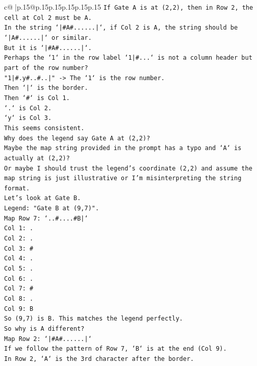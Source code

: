 \documentclass{article}
\begin{document}
{\begin{supertabular}{c@{$\;$}|p{.15\linewidth}@{}p{.15\linewidth}p{.15\linewidth}p{.15\linewidth}p{.15\linewidth}p{.15\linewidth}}
{{{\texttt{If Gate A is at (2,2), then in Row 2, the cell at Col 2 must be A.} \\
\texttt{In the string `|\#A\#......|`, if Col 2 is A, the string should be `|A\#......|` or similar.} \\
\texttt{But it is `|\#A\#......|`.} \\
\texttt{Perhaps the `1` in the row label `1|\#...` is not a column header but part of the row number?} \\
\texttt{"1|\#.y\#..\#..|" {-}> The `1` is the row number.} \\
\texttt{Then `|` is the border.} \\
\texttt{Then `\#` is Col 1.} \\
\texttt{`.` is Col 2.} \\
\texttt{`y` is Col 3.} \\
\texttt{This seems consistent.} \\
\texttt{Why does the legend say Gate A at (2,2)?} \\
\texttt{Maybe the map string provided in the prompt has a typo and `A` is actually at (2,2)?} \\
\texttt{Or maybe I should trust the legend's coordinate (2,2) and assume the map string is just illustrative or I'm misinterpreting the string format.} \\
\texttt{Let's look at Gate B.} \\
\texttt{Legend: "Gate B at (9,7)".} \\
\texttt{Map Row 7: `..\#....\#B|`} \\
\texttt{Col 1: .} \\
\texttt{Col 2: .} \\
\texttt{Col 3: \#} \\
\texttt{Col 4: .} \\
\texttt{Col 5: .} \\
\texttt{Col 6: .} \\
\texttt{Col 7: \#} \\
\texttt{Col 8: .} \\
\texttt{Col 9: B} \\
\texttt{So (9,7) is B. This matches the legend perfectly.} \\
\texttt{So why is A different?} \\
\texttt{Map Row 2: `|\#A\#......|`} \\
\texttt{If we follow the pattern of Row 7, `B` is at the end (Col 9).} \\
\texttt{In Row 2, `A` is the 3rd character after the border.} \\
}}}
\end{supertabular}}
\end{document}
